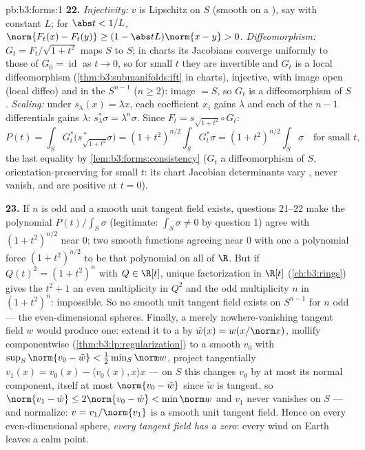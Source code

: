 \begin{solution}{pb:b3:forms:1}
\textbf{22.} \emph{Injectivity:} $v$ is Lipschitz on $S$
(smooth on a ), say with constant $L$; for $\abs t <
1/L$, $\norm{F_t(x) - F_t(y)} \geq (1 - \abs
tL)\norm{x - y} > 0$. \emph{Diffeomorphism:} $G_t =
F_t/\sqrt{1 + t^2}$ maps $S$ to $S$; in charts its Jacobians
converge uniformly to those of $G_0 = \operatorname{id}$ as
$t \to 0$, so for small $t$ they are invertible and $G_t$ is
a local diffeomorphism (\cref{thm:b3:submanifolds:ift} in
charts), injective, with image open (local diffeo) and
 in the \emph{} $S^{n-1}$ ($n \geq 2$):
image $= S$, so $G_t$ is a diffeomorphism of $S$.
\emph{Scaling:} under $s_\lambda(x) = \lambda x$, each
coefficient $x_i$ gains $\lambda$ and each of the $n - 1$
differentials gains $\lambda$: $s_\lambda^*\sigma =
\lambda^n\sigma$. Since $F_t = s_{\sqrt{1+t^2}}\circ G_t$:
\[
P(t) = \int_SG_t^*\bigl(s_{\sqrt{1+t^2}}^{\,*}\sigma\bigr)
= (1 + t^2)^{n/2}\int_SG_t^*\sigma
= (1 + t^2)^{n/2}\int_S\sigma
\quad\text{for small } t,
\]
the last equality by \cref{lem:b3:forms:consistency} ($G_t$
a diffeomorphism of $S$, orientation-preserving for small
$t$: its chart Jacobian determinants vary ,
never vanish, and are positive at $t = 0$).

\textbf{23.} If $n$ is odd and a smooth unit tangent field
exists, questions 21--22 make the polynomial
$P(t)/\int_S\sigma$ (legitimate: $\int_S\sigma \neq 0$ by
question 1) agree with $(1 + t^2)^{n/2}$ near $0$; two
smooth functions agreeing near $0$ with one a polynomial
force $(1 + t^2)^{n/2}$ to be that polynomial on all of
$\R$. But if $Q(t)^2 = (1 + t^2)^n$ with $Q \in \R[t]$,
unique factorization in $\R[t]$
(\cref{ch:b3:rings}) gives the  $t^2 + 1$ an even
multiplicity in $Q^2$ and the odd multiplicity $n$ in
$(1 + t^2)^n$: impossible. So no smooth unit tangent field
exists on $S^{n-1}$ for $n$ odd --- the even-dimensional
spheres. Finally, a merely  nowhere-vanishing
tangent field $w$ would produce one: extend it to a
 by $\tilde w(x) = w(x/\norm x)$, mollify
componentwise (\cref{thm:b3:lp:regularization}) to a smooth
$v_0$ with $\sup_S\norm{v_0 - \tilde w} <
\frac12\min_S\norm w$, project tangentially $v_1(x) = v_0(x)
- \langle v_0(x), x\rangle x$ --- on $S$ this changes $v_0$
by at most its normal component, itself at most $\norm{v_0 -
\tilde w}$ since $\tilde w$ is tangent, so $\norm{v_1 - \tilde
w} \leq 2\norm{v_0 - \tilde w} < \min\norm w$ and $v_1$
never vanishes on $S$ --- and normalize: $v =
v_1/\norm{v_1}$ is a smooth unit tangent field. Hence on
every even-dimensional sphere, \emph{every 
tangent field has a zero}: every wind on Earth leaves a calm
point.


\end{solution}
